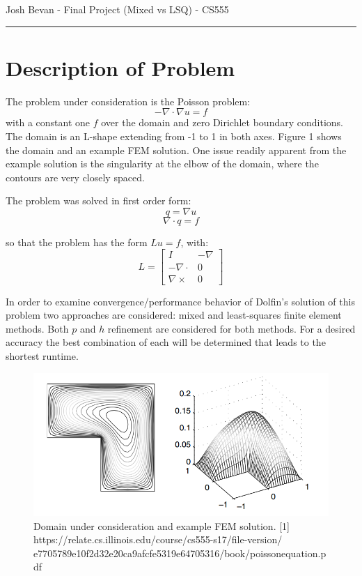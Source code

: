 \documentclass[letterpaper,10pt]{article}
\newcommand{\bes}{\begin{equation*}}
\newcommand{\ees}{\end{equation*}}
\begin{document}
\begin{flushright}
{\Large Josh Bevan - Final Project (Mixed vs LSQ) - CS555}
\end{flushright}
\vskip -0.1in
\hrule
\vskip 0.4in

\section*{Description of Problem}
The problem under consideration is the Poisson problem:
\bes -\nabla \cdot \nabla u = f \ees
with a constant one $f$ over the domain and zero Dirichlet boundary conditions. The domain is an L-shape extending from -1 to 1 in both axes. Figure 1 shows the domain and an example FEM solution. One issue readily apparent from the example solution is the singularity at the elbow of the domain, where the contours are very closely spaced.

The problem was solved in first order form:
\bes q = \nabla u\ees
\bes \nabla \cdot q = f \ees

so that the problem has the form $Lu = f$, with:
\bes L = \begin{bmatrix}I & -\nabla\\ -\nabla \cdot & 0\\ \nabla\times & 0\end{bmatrix}\ees

In order to examine convergence/performance behavior of Dolfin's solution of this problem two approaches are considered: mixed and least-squares finite element methods. Both $p$ and $h$ refinement are considered for both methods. For a desired accuracy the best combination of each will be determined that leads to the shortest runtime.

\begin{figure}[!htb]
\centering
\includegraphics[width=1 \linewidth]{prob.PNG}
\caption{Domain under consideration and example FEM solution. \newline \small [1] https://relate.cs.illinois.edu/course/cs555-s17/file-version/ e7705789e10f2d32e20ca9afcfe5319e64705316/book/poissonequation.pdf}
\end{figure}
\newpage
\end{document}
